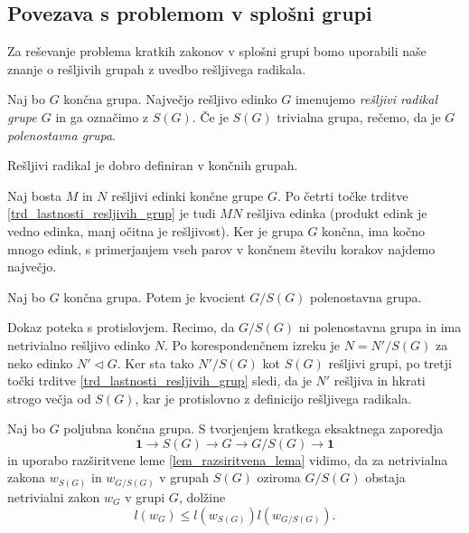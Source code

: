 \subsection{Povezava s problemom v splošni grupi}

Za reševanje problema kratkih zakonov v splošni grupi bomo uporabili naše znanje o rešljivih grupah z uvedbo rešljivega radikala.

\begin{definicija}
\label{def_resljiv_radikal}
Naj bo $G$ končna grupa. Največjo rešljivo edinko $G$ imenujemo \emph{rešljivi radikal grupe $G$} in ga označimo z $S(G)$. Če je $S(G)$ trivialna grupa, rečemo, da je $G$ \emph{polenostavna grupa}.
\end{definicija}
\begin{lema}
\label{lem_dobra_definiranost_resljivega_radikala}
Rešljivi radikal je dobro definiran v končnih grupah.
\end{lema}
\begin{dokaz}
    Naj bosta $M$ in $N$ rešljivi edinki končne grupe $G$. Po četrti točke trditve \ref{trd_lastnosti_resljivih_grup} je tudi $MN$ rešljiva edinka (produkt edink je vedno edinka, manj očitna je rešljivost). Ker je grupa $G$ končna, ima kočno mnogo edink,
    s primerjanjem vseh parov v končnem številu korakov najdemo največjo. 
\end{dokaz}

\begin{lema}
\label{lem_kvoocient_resljivega_radikala_je_polenostaven}
Naj bo $G$ končna grupa. Potem je kvocient $G / S(G)$ polenostavna grupa. 
\end{lema}
\begin{dokaz}
    Dokaz poteka s protislovjem. Recimo, da $G / S(G)$ ni polenostavna grupa in ima netrivialno rešljivo edinko $N$. Po korespondenčnem izreku je $N = N' / S(G)$ za neko edinko $N' \triangleleft G$.
    Ker sta tako $N' / S(G)$ kot $S(G)$ rešljivi grupi, po tretji točki trditve \ref{trd_lastnosti_resljivih_grup} sledi, da je $N'$ rešljiva in hkrati strogo večja od $S(G)$, kar je protislovno z definicijo rešljivega radikala.
\end{dokaz}

Naj bo $G$ poljubna končna grupa. S tvorjenjem kratkega eksaktnega zaporedja \begin{equation*}
\mathbf{1} \to S(G) \to G \to  G / S(G) \to  \mathbf{1}
\end{equation*}  
in uporabo razširitvene leme \ref{lem_razsiritvena_lema} vidimo, da za netrivialna zakona $w_{S(G)}$ in $w_{G / S(G)}$ v grupah $S(G)$ oziroma $G / S(G)$ obstaja netrivialni zakon $w_G$ v grupi $G$, dolžine \begin{equation*}
l(w_G) \le  l(w_{S(G)}) l (w_{G / S(G)}).
\end{equation*}  



